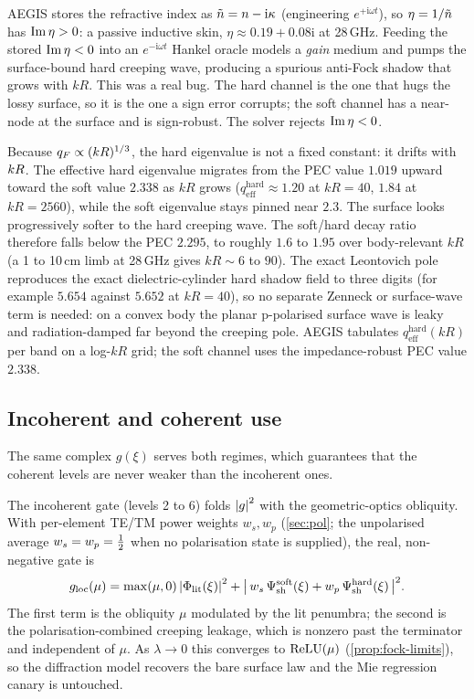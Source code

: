 \begin{remark}\label{rem:gain-sign}
AEGIS stores the refractive index as $\tilde{n}=n-\mathrm{i}\kappa$ (engineering
$e^{+\mathrm{i}\omega t}$), so $\eta=1/\tilde{n}$ has $\operatorname{Im}\eta>0$: a passive
inductive skin, $\eta\approx 0.19+0.08\mathrm{i}$ at 28\,GHz. Feeding the stored
$\operatorname{Im}\eta<0$ into an $e^{-\mathrm{i}\omega t}$ Hankel oracle models a \emph{gain}
medium and pumps the surface-bound hard creeping wave, producing a spurious
anti-Fock shadow that grows with $kR$. This was a real bug. The hard channel
is the one that hugs the lossy surface, so it is the one a sign error corrupts;
the soft channel has a near-node at the surface and is sign-robust. The solver
rejects $\operatorname{Im}\eta<0$.
\end{remark}

Because $q_{F}\propto(kR)^{1/3}$, the hard eigenvalue is not a fixed constant:
it drifts with $kR$. The effective hard eigenvalue migrates from the PEC
value $1.019$ upward toward the soft value $2.338$ as $kR$ grows
($q_{\mathrm{eff}}^{\text{hard}}\approx 1.20$ at $kR=40$, $1.84$ at $kR=2560$),
while the soft eigenvalue stays pinned near $2.3$. The surface looks
progressively softer to the hard creeping wave. The soft/hard decay ratio
therefore falls below the PEC $2.295$, to roughly $1.6$ to $1.95$ over
body-relevant $kR$ (a 1 to 10\,cm limb at 28\,GHz gives $kR\sim 6$ to $90$). The
exact Leontovich pole reproduces the exact dielectric-cylinder hard shadow field
to three digits (for example $5.654$ against $5.652$ at $kR=40$), so no separate
Zenneck or surface-wave term is needed: on a convex body the planar p-polarised
surface wave is leaky and radiation-damped far beyond the creeping pole. AEGIS
tabulates $q_{\mathrm{eff}}^{\text{hard}}(kR)$ per band on a log-$kR$ grid; the
soft channel uses the impedance-robust PEC value $2.338$.

\subsection{Incoherent and coherent use}\label{sec:fock-use}

The same complex $g(\xi)$ serves both regimes, which guarantees that the coherent
levels are never weaker than the incoherent ones.

The incoherent gate (levels 2 to 6) folds $\abs{g}^2$ with the geometric-optics
obliquity. With per-element TE/TM power weights $w_s,w_p$ (\cref{sec:pol}; the
unpolarised average $w_s=w_p=\tfrac{1}{2}$ when no polarisation state is supplied), the
real, non-negative gate is
\begin{equation}\label{eq:fock-local}
  g_{\mathrm{loc}}(\mu) = \max(\mu,0)\,\abs{\Phi_{\mathrm{lit}}(\xi)}^2
  + \bigl\lvert\, w_s\,\Psi_{\mathrm{sh}}^{\text{soft}}(\xi)
                 + w_p\,\Psi_{\mathrm{sh}}^{\text{hard}}(\xi)\,\bigr\rvert^2 .
\end{equation}
The first term is the obliquity $\mu$ modulated by the lit penumbra; the second
is the polarisation-combined creeping leakage, which is nonzero past the
terminator and independent of $\mu$. As $\lambda\to 0$ this converges to
$\operatorname{ReLU}(\mu)$ (\cref{prop:fock-limits}), so the diffraction model recovers the
bare surface law and the Mie regression canary is untouched.

